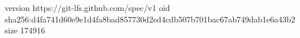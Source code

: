 version https://git-lfs.github.com/spec/v1
oid sha256:d4fa741d60e9e1d4fa8bad857730d2ed4cdb507b701bac67ab749dab1e6a43b2
size 174916
